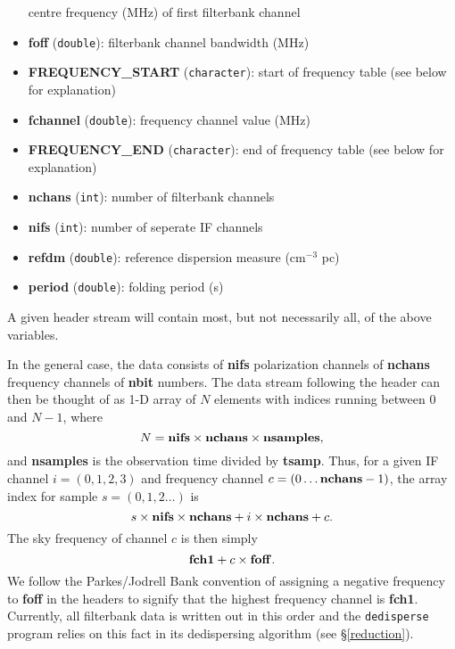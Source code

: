 \documentclass[11pt]{article}
\begin{document}
\begin{itemize}
centre frequency (MHz) of first filterbank channel
\item {\bf foff}  (\verb+double+): 
filterbank channel bandwidth (MHz)
\item {\bf FREQUENCY\_START}  (\verb+character+): 
start of frequency table (see below for explanation)
\item {\bf fchannel}  (\verb+double+): 
frequency channel value (MHz)
\item {\bf FREQUENCY\_END}  (\verb+character+): 
end of frequency table (see below for explanation)
\item {\bf nchans} (\verb+int+): 
number of filterbank channels
\item {\bf nifs} (\verb+int+): 
number of seperate IF channels
\item {\bf refdm}  (\verb+double+): 
reference dispersion measure (cm$^{-3}$ pc)
\item {\bf period}  (\verb+double+): 
folding period (s)
\end{itemize}
A given header stream will contain most, but not necessarily all, of the 
above variables. 

In the general case, the data consists of {\bf nifs} polarization
channels of {\bf nchans} frequency channels of {\bf nbit} numbers. The
data stream following the header can then be thought of as 1-D array
of $N$ elements with indices running between 0 and $N-1$, where
\begin{displaymath}
	N = {\rm \bf nifs} \times {\rm \bf nchans} \times {\rm \bf nsamples},
\end{displaymath}
and {\bf nsamples} is the observation time divided by {\bf tsamp}.
Thus, for a given IF channel $i = (0,1,2,3)$ and frequency channel $c
= (0 \dots {\rm \bf nchans}-1)$, the array index for sample $s =
(0,1,2 \dots)$ is
\begin{displaymath}
s \times {\rm \bf nifs} \times {\rm \bf nchans}+ i \times {\rm \bf nchans} + c.
\end{displaymath}
The sky frequency of channel $c$ is then simply
\begin{displaymath}
		{\rm \bf fch1} + c \times {\rm \bf foff}.
\end{displaymath}
We follow the Parkes/Jodrell Bank
convention of assigning a negative frequency to {\bf
foff} in the headers to signify that the highest frequency channel is
{\bf fch1}.  Currently, all filterbank data is written out in this order
and the {\tt dedisperse} program relies on this fact in its dedispersing
algorithm (see \S \ref{reduction}).
\end{document}
